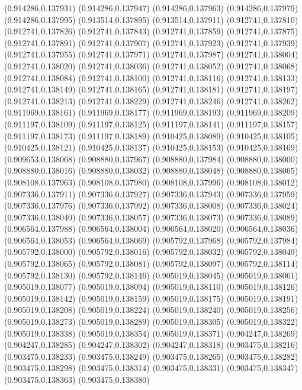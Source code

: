 (0.914286,0.137931)
(0.914286,0.137947)
(0.914286,0.137963)
(0.914286,0.137979)
(0.914286,0.137995)
(0.913514,0.137895)
(0.913514,0.137911)
(0.912741,0.137810)
(0.912741,0.137826)
(0.912741,0.137843)
(0.912741,0.137859)
(0.912741,0.137875)
(0.912741,0.137891)
(0.912741,0.137907)
(0.912741,0.137923)
(0.912741,0.137939)
(0.912741,0.137955)
(0.912741,0.137971)
(0.912741,0.137987)
(0.912741,0.138004)
(0.912741,0.138020)
(0.912741,0.138036)
(0.912741,0.138052)
(0.912741,0.138068)
(0.912741,0.138084)
(0.912741,0.138100)
(0.912741,0.138116)
(0.912741,0.138133)
(0.912741,0.138149)
(0.912741,0.138165)
(0.912741,0.138181)
(0.912741,0.138197)
(0.912741,0.138213)
(0.912741,0.138229)
(0.912741,0.138246)
(0.912741,0.138262)
(0.911969,0.138161)
(0.911969,0.138177)
(0.911969,0.138193)
(0.911969,0.138209)
(0.911197,0.138109)
(0.911197,0.138125)
(0.911197,0.138141)
(0.911197,0.138157)
(0.911197,0.138173)
(0.911197,0.138189)
(0.910425,0.138089)
(0.910425,0.138105)
(0.910425,0.138121)
(0.910425,0.138137)
(0.910425,0.138153)
(0.910425,0.138169)
(0.909653,0.138068)
(0.908880,0.137967)
(0.908880,0.137984)
(0.908880,0.138000)
(0.908880,0.138016)
(0.908880,0.138032)
(0.908880,0.138048)
(0.908880,0.138065)
(0.908108,0.137963)
(0.908108,0.137980)
(0.908108,0.137996)
(0.908108,0.138012)
(0.907336,0.137911)
(0.907336,0.137927)
(0.907336,0.137943)
(0.907336,0.137959)
(0.907336,0.137976)
(0.907336,0.137992)
(0.907336,0.138008)
(0.907336,0.138024)
(0.907336,0.138040)
(0.907336,0.138057)
(0.907336,0.138073)
(0.907336,0.138089)
(0.906564,0.137988)
(0.906564,0.138004)
(0.906564,0.138020)
(0.906564,0.138036)
(0.906564,0.138053)
(0.906564,0.138069)
(0.905792,0.137968)
(0.905792,0.137984)
(0.905792,0.138000)
(0.905792,0.138016)
(0.905792,0.138032)
(0.905792,0.138049)
(0.905792,0.138065)
(0.905792,0.138081)
(0.905792,0.138097)
(0.905792,0.138114)
(0.905792,0.138130)
(0.905792,0.138146)
(0.905019,0.138045)
(0.905019,0.138061)
(0.905019,0.138077)
(0.905019,0.138094)
(0.905019,0.138110)
(0.905019,0.138126)
(0.905019,0.138142)
(0.905019,0.138159)
(0.905019,0.138175)
(0.905019,0.138191)
(0.905019,0.138208)
(0.905019,0.138224)
(0.905019,0.138240)
(0.905019,0.138256)
(0.905019,0.138273)
(0.905019,0.138289)
(0.905019,0.138305)
(0.905019,0.138322)
(0.905019,0.138338)
(0.905019,0.138354)
(0.905019,0.138371)
(0.904247,0.138269)
(0.904247,0.138285)
(0.904247,0.138302)
(0.904247,0.138318)
(0.903475,0.138216)
(0.903475,0.138233)
(0.903475,0.138249)
(0.903475,0.138265)
(0.903475,0.138282)
(0.903475,0.138298)
(0.903475,0.138314)
(0.903475,0.138331)
(0.903475,0.138347)
(0.903475,0.138363)
(0.903475,0.138380)
